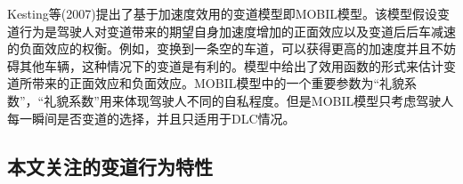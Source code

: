 %
Kesting等(2007)提出了基于加速度效用的变道模型即MOBIL模型\cite{Kesting2007}。该模型假设变道行为是驾驶人对变道带来的期望自身加速度增加的正面效应以及变道后后车减速的负面效应的权衡。例如，变换到一条空的车道，可以获得更高的加速度并且不妨碍其他车辆，这种情况下的变道是有利的。模型中给出了效用函数的形式来估计变道所带来的正面效应和负面效应。MOBIL模型中的一个重要参数为“礼貌系数”，“礼貌系数”用来体现驾驶人不同的自私程度。但是MOBIL模型只考虑驾驶人每一瞬间是否变道的选择，并且只适用于DLC情况。



\subsection{本文关注的变道行为特性}


